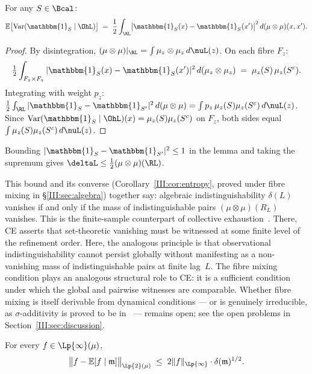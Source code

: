 \begin{lemma}
\label{III:lem:cond-var}
For any $S \in \Bcal$:
\[
  \mathbb{E}\bigl[\mathrm{Var}(\mathbbm{1}_S \mid \OhL)\bigr]
  \;=\;
  \frac{1}{2}
  \int_{\RL}
  \bigl|\mathbbm{1}_S(x) - \mathbbm{1}_S(x')\bigr|^2
  \,d(\mu \otimes \mu)(x,x').
\]
\end{lemma}

\begin{proof}
By disintegration, $(\mu \otimes \mu)|_{\RL} = \int \mu_z \otimes \mu_z\,d\nuL(z)$.
On each fibre $F_z$:
\[
  \tfrac{1}{2}\int_{F_z \times F_z}
    |\mathbbm{1}_S(x) - \mathbbm{1}_S(x')|^2
    \,d(\mu_z \otimes \mu_z)
  \;=\; \mu_z(S)\,\mu_z(S^c).
\]
Integrating with weight $p_z$:
$\tfrac{1}{2}\int_{\RL}|\mathbbm{1}_S - \mathbbm{1}_{S'}|^2\,d(\mu\otimes\mu)
= \int p_z\,\mu_z(S)\mu_z(S^c)\,d\nuL(z)$.
Since $\mathrm{Var}(\mathbbm{1}_S \mid \OhL)(x) = \mu_z(S)\mu_z(S^c)$ on $F_z$,
both sides equal $\int \mu_z(S)\mu_z(S^c)\,d\nuL(z)$.
\end{proof}

Bounding $|\mathbbm{1}_S - \mathbbm{1}_{S'}|^2 \leq 1$ in the lemma and taking the supremum
gives $\deltaL \leq \tfrac{1}{2}(\mu\otimes\mu)(\RL)$.

\begin{remark}
This bound and its converse (Corollary~\ref{III:cor:entropy}, proved
under fibre mixing in \S\ref{III:sec:algebra}) together say: algebraic
indistinguishability $\delta(L)$ vanishes if and only if the mass of
indistinguishable pairs $(\mu\otimes\mu)(R_L)$ vanishes.  This is the
finite-sample counterpart of collective exhaustion~\cite{mahon_paper1}.  There, CE
asserts that set-theoretic vanishing must be witnessed at some finite level of
the refinement order.  Here, the analogous principle is that observational
indistinguishability cannot persist globally without manifesting as a
non-vanishing mass of indistinguishable pairs at finite lag~$L$.  The fibre
mixing condition plays an analogous structural role to CE: it is a sufficient
condition under which the global and pairwise witnesses are comparable.
Whether fibre mixing is itself derivable from dynamical conditions --- or is
genuinely irreducible, as $\sigma$-additivity is proved to be in~\cite{mahon_paper1} --- remains open;
see the open problems in Section~\ref{III:sec:discussion}.
\end{remark}

\begin{lemma}
\label{III:lem:bias}
For every $f \in \Lp{\infty}(\mu)$,
\[
  \bigl\| f - \mathbb{E}[f \mid \mathfrak{m}] \bigr\|_{\Lp{2}(\mu)}
  \;\leq\;
  2\|f\|_{\Lp{\infty}} \cdot \delta(\mathfrak{m})^{1/2}.
\]
\end{lemma}

